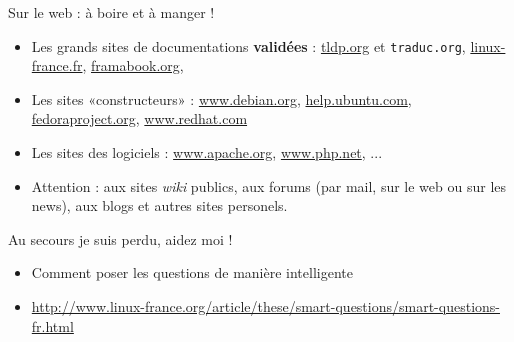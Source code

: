 \documentclass[french]{beamer}
\begin{document}
\begin{frame}
Sur le web : à boire et à manger !
    \begin{itemize}
    \item Les grands sites de documentations \textbf{validées} : \url{tldp.org}
    et \texttt{traduc.org}, \url{linux-france.fr}, \url{framabook.org}, 
    \item Les sites «constructeurs» : \url{www.debian.org},
    \url{help.ubuntu.com}, \url{fedoraproject.org}, \url{www.redhat.com}
    \item Les sites des logiciels : \url{www.apache.org}, \url{www.php.net}, ...
    \item Attention : aux sites \textit{wiki} publics, aux forums (par mail, sur le web ou sur les news), aux blogs et autres sites personels.
    \end{itemize}
\end{frame}


\begin{frame}
Au secours je suis perdu, aidez moi !
    \begin{itemize}
    \item Comment poser les questions de manière intelligente
    \item \url{http://www.linux-france.org/article/these/smart-questions/smart-questions-fr.html}
    \end{itemize}
\end{frame}
\end{document}
